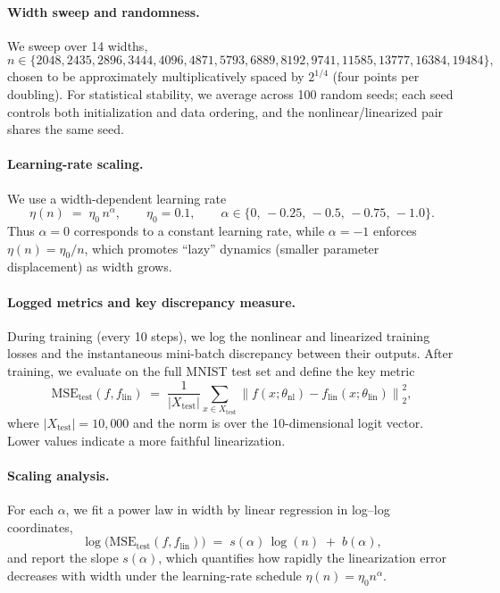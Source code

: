 \documentclass{article} %
\begin{document}
\paragraph{Width sweep and randomness.}
We sweep over 14 widths,
\begin{equation}
n \in \{2048, 2435, 2896, 3444, 4096, 4871, 5793, 6889, 8192, 9741, 11585, 13777, 16384, 19484\},
\end{equation}
chosen to be approximately multiplicatively spaced by \(2^{1/4}\) (four points per doubling). For statistical stability, we average across 100 random seeds; each seed controls both initialization and data ordering, and the nonlinear/linearized pair shares the same seed.

\paragraph{Learning-rate scaling.}
We use a width-dependent learning rate
\begin{equation}
\eta(n) \;=\; \eta_0\, n^{\alpha},
\qquad \eta_0=0.1,
\qquad \alpha \in \{0,\,-0.25,\,-0.5,\,-0.75,\,-1.0\}.
\end{equation}
Thus \(\alpha=0\) corresponds to a constant learning rate, while \(\alpha=-1\) enforces \(\eta(n)=\eta_0/n\), which promotes ``lazy'' dynamics (smaller parameter displacement) as width grows.

\paragraph{Logged metrics and key discrepancy measure.}
During training (every 10 steps), we log the nonlinear and linearized training losses and the instantaneous mini-batch discrepancy between their outputs. After training, we evaluate on the full MNIST test set and define the key metric
\begin{equation}
\mathrm{MSE}_{\text{test}}(f,f_{\text{lin}})
\;=\;
\frac{1}{|X_{\text{test}}|}
\sum_{x\in X_{\text{test}}}
\left\| f(x;\theta_{\text{nl}}) - f_{\text{lin}}(x;\theta_{\text{lin}})\right\|_2^2,
\label{eq:test_mse_between}
\end{equation}
where \(|X_{\text{test}}|=10{,}000\) and the norm is over the 10-dimensional logit vector. Lower values indicate a more faithful linearization.

\paragraph{Scaling analysis.}
For each \(\alpha\), we fit a power law in width by linear regression in log--log coordinates,
\begin{equation}
\log\!\Big(\mathrm{MSE}_{\text{test}}(f,f_{\text{lin}})\Big)
\;=\;
s(\alpha)\,\log(n)\;+\;b(\alpha),
\end{equation}
and report the slope \(s(\alpha)\), which quantifies how rapidly the linearization error decreases with width under the learning-rate schedule \(\eta(n)=\eta_0 n^\alpha\).
\end{document}
